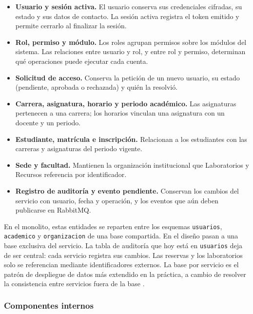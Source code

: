 \begin{itemize}
    \item \textbf{Usuario y sesión activa.} El usuario conserva sus
    credenciales cifradas, su estado y sus datos de contacto. La sesión
    activa registra el token emitido y permite cerrarlo al finalizar la
    sesión.
    \item \textbf{Rol, permiso y módulo.} Los roles agrupan permisos sobre
    los módulos del sistema. Las relaciones entre usuario y rol, y entre rol
    y permiso, determinan qué operaciones puede ejecutar cada cuenta.
    \item \textbf{Solicitud de acceso.} Conserva la petición de un nuevo
    usuario, su estado (pendiente, aprobada o rechazada) y quién la resolvió.
    \item \textbf{Carrera, asignatura, horario y periodo académico.}
    Las asignaturas pertenecen a una carrera; los horarios vinculan una
    asignatura con un docente y un periodo.
    \item \textbf{Estudiante, matrícula e inscripción.} Relacionan a los
    estudiantes con las carreras y asignaturas del periodo vigente.
    \item \textbf{Sede y facultad.} Mantienen la organización institucional
    que Laboratorios y Recursos referencia por identificador.
    \item \textbf{Registro de auditoría y evento pendiente.} Conservan los
    cambios del servicio con usuario, fecha y operación, y los eventos que
    aún deben publicarse en RabbitMQ.
\end{itemize}

En el monolito, estas entidades se reparten entre los esquemas
\texttt{usuarios}, \texttt{academico} y \texttt{organizacion} de una base
compartida. En el diseño pasan a una base exclusiva del servicio. La tabla de
auditoría que hoy está en \texttt{usuarios} deja de ser central: cada servicio
registra sus cambios. Las reservas y los laboratorios solo se referencian
mediante identificadores externos. La base por servicio es el patrón de
despliegue de datos más extendido en la práctica, a cambio de resolver la
consistencia entre servicios fuera de la base \cite{laigner2021datamanagement}.

\subsubsection{Componentes internos}

